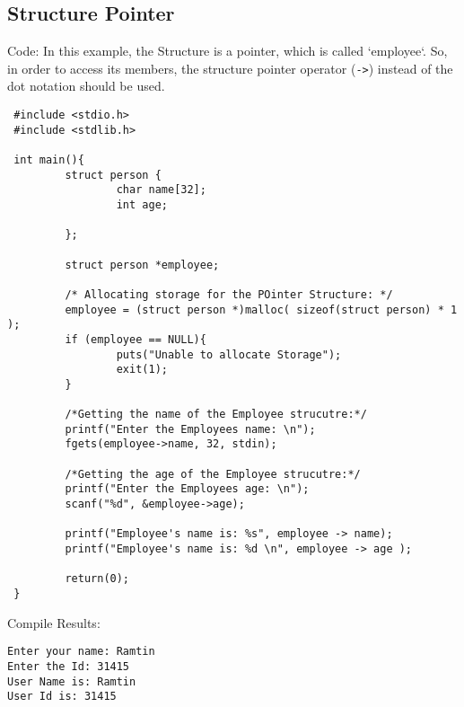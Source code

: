 \subsection{Structure Pointer}
Code:
In this example, the Structure is a pointer, which is called `employee`. So, in order to access its members,
the structure pointer operator (\texttt{->}) instead of the dot notation should be used.
\begin{lstlisting} 
 #include <stdio.h>
 #include <stdlib.h>

 int main(){
         struct person {
                 char name[32];
                 int age;

         };

         struct person *employee;

         /* Allocating storage for the POinter Structure: */
         employee = (struct person *)malloc( sizeof(struct person) * 1 );
         if (employee == NULL){
                 puts("Unable to allocate Storage");
                 exit(1);
         }

         /*Getting the name of the Employee strucutre:*/
         printf("Enter the Employees name: \n");
         fgets(employee->name, 32, stdin);

         /*Getting the age of the Employee strucutre:*/
         printf("Enter the Employees age: \n");
         scanf("%d", &employee->age);

         printf("Employee's name is: %s", employee -> name);
         printf("Employee's name is: %d \n", employee -> age );

         return(0);
 }
\end{lstlisting}

Compile Results:
\begin{lstlisting} 
Enter your name: Ramtin
Enter the Id: 31415
User Name is: Ramtin
User Id is: 31415
\end{lstlisting}

